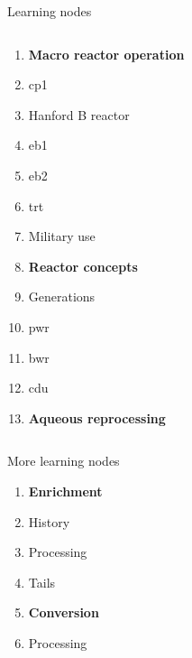 \documentclass[aspectratio=1610,pdftex,dvipsnames,compress,xcolor={dvipsnames}]{beamer}
\newcommand{\acs}{\acrshort} %
\begin{document}
\begin{frame}{Learning nodes}
\begin{columns}[t]
        \begin{column}{0.50\textwidth}
            \begin{enumerate}[series=outerlist,topsep=0pt,itemsep=1pt,leftmargin=*,label=(\arabic*)]
                \item[]\hfill\textbf{Macro reactor operation}
                \item[]\hfill \acs{cp1}
                \item[]\hfill Hanford B reactor
                \item[]\hfill \acs{eb1}
                \item[]\hfill \acs{eb2}
                \item[]\hfill \acs{trt} 
                \item[]\hfill Military use
                    \vspace{0.15in}
                \item[]\hfill\textbf{Reactor concepts}
                \item[]\hfill Generations
                \item[]\hfill \acs{pwr}
                \item[]\hfill \acs{bwr}
                \item[]\hfill \acs{cdu}
                    \vspace{0.15in}
                \item[]\hfill\textbf{Aqueous reprocessing}
            \end{enumerate}
        \end{column}

    \end{columns}
\end{frame}


\begin{frame}{More learning nodes}
    \begin{enumerate}[series=outerlist,topsep=0pt,itemsep=1pt,leftmargin=*,label=(\arabic*)]
        \item[]\textbf{Enrichment}
        \item[]History
        \item[]Processing
        \item[]Tails
            \vspace{0.15in}
        \item[]\textbf{Conversion}
        \item[]Processing
    \end{enumerate}
\end{frame}
\end{document}
